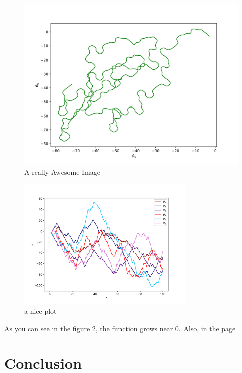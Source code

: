 \documentclass[runningheads]{llncs}
\begin{document}
\begin{figure}[!htb]
  \includegraphics[width=\linewidth]{img/theta_theta_3.png}
  \caption{A really Awesome Image}\label{fig:theta_vs_theta_3}
\endminipage
\end{figure}


\begin{figure}[h]
    \centering
    \includegraphics[width=0.75\textwidth]{img/compare_double_pen_1.png}
    \caption{a nice plot}
    \label{fig:compare_theta_vs_time}
\end{figure}
 
As you can see in the figure \ref{fig:compare_theta_vs_time}, the 
function grows near 0. Also, in the page \pageref{fig:compare_theta_vs_time} 



\section{Conclusion}
\end{document}

